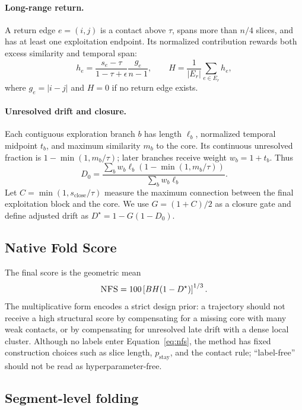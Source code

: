 \documentclass{article}
\newcommand{\nfs}{\textsc{NFS}}
\begin{document}
\paragraph{Long-range return.}
A return edge $e=(i,j)$ is a contact above $\tau$, spans more than $n/4$ slices, and has at least one exploitation endpoint. Its normalized contribution rewards both excess similarity and temporal span:
\begin{equation}
h_e=\frac{s_e-\tau}{1-\tau+\epsilon}\frac{g_e}{n-1},
\qquad H=\frac{1}{|E_r|}\sum_{e\in E_r}h_e,
\end{equation}
where $g_e=|i-j|$ and $H=0$ if no return edge exists.

\paragraph{Unresolved drift and closure.}
Each contiguous exploration branch $b$ has length $\ell_b$, normalized temporal midpoint $t_b$, and maximum similarity $m_b$ to the core. Its continuous unresolved fraction is $1-\min(1,m_b/\tau)$; later branches receive weight $w_b=1+t_b$. Thus
\begin{equation}
D_0=\frac{\sum_b w_b\ell_b\left(1-\min(1,m_b/\tau)\right)}{\sum_b w_b\ell_b}.
\end{equation}
Let $C=\min(1,s_{\mathrm{close}}/\tau)$ measure the maximum connection between the final exploitation block and the core. We use $G=(1+C)/2$ as a closure gate and define adjusted drift as $D^{\star}=1-G(1-D_0)$.

\subsection{Native Fold Score}

The final score is the geometric mean
\begin{equation}
\nfs=100\left[BH(1-D^{\star})\right]^{1/3}.
\label{eq:nfs}
\end{equation}
The multiplicative form encodes a strict design prior: a trajectory should not receive a high structural score by compensating for a missing core with many weak contacts, or by compensating for unresolved late drift with a dense local cluster. Although no labels enter Equation~\ref{eq:nfs}, the method has fixed construction choices such as slice length, $p_{\mathrm{stay}}$, and the contact rule; ``label-free'' should not be read as hyperparameter-free.

\subsection{Segment-level folding}
\end{document}

